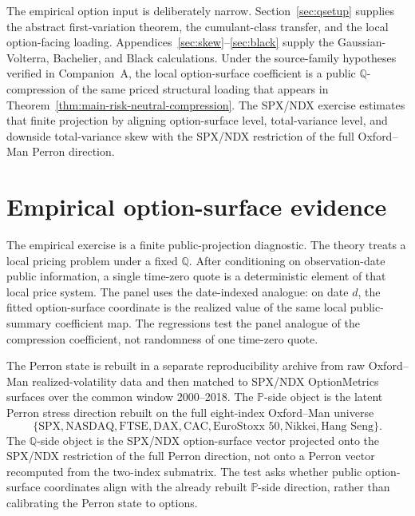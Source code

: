 \documentclass[11pt,a4paper]{amsart}
\theoremstyle{plain}
\theoremstyle{definition}
\theoremstyle{remark}
\newcommand{\PP}{\mathbb{P}}
\newcommand{\QQ}{\mathbb{Q}}
\begin{document}
The empirical option input is deliberately narrow.  Section~\ref{sec:qsetup} supplies the abstract
first-variation theorem, the cumulant-class transfer, and the local option-facing loading.
Appendices~\ref{sec:skew}--\ref{sec:black} supply the Gaussian-Volterra, Bachelier, and Black
calculations.  Under the source-family hypotheses verified in Companion~A, the local option-surface
coefficient is a public \(\QQ\)-compression of the same priced structural loading that appears in
Theorem~\ref{thm:main-risk-neutral-compression}.  The SPX/NDX exercise estimates that finite
projection by aligning option-surface level, total-variance level, and downside total-variance skew
with the SPX/NDX restriction of the full Oxford--Man Perron direction.


\section{Empirical option-surface evidence}\label{sec:empirical}

The empirical exercise is a finite public-projection diagnostic.  The theory treats a local pricing
problem under a fixed \(\QQ\).  After conditioning on observation-date public information, a single
time-zero quote is a deterministic element of that local price system.  The panel uses the
date-indexed analogue: on date \(d\), the fitted option-surface coordinate is the realized value of
the same local public-summary coefficient map.  The regressions test the panel analogue of the
compression coefficient, not randomness of one time-zero quote.

The Perron state is rebuilt in a separate reproducibility archive from raw Oxford--Man
realized-volatility data and then matched to SPX/NDX OptionMetrics surfaces over the common window
2000--2018.  The \(\PP\)-side object is the latent Perron stress direction rebuilt on the full
eight-index Oxford--Man universe
\[
        \{\text{SPX},\text{NASDAQ},\text{FTSE},\text{DAX},\text{CAC},\text{EuroStoxx 50},
        \text{Nikkei},\text{Hang Seng}\}.
\]
The \(\QQ\)-side object is the SPX/NDX option-surface vector projected onto the SPX/NDX restriction
of the full Perron direction, not onto a Perron vector recomputed from the two-index submatrix.
The test asks whether public option-surface coordinates align with the already rebuilt
\(\PP\)-side direction, rather than calibrating the Perron state to options.
\end{document}
